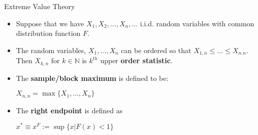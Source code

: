 \documentclass[notes]{beamer}
\begin{document}
\begin{frame}{Extreme Value Theory}
\begin{itemize}
\item Suppose that we have $X_1, X_2, ... , X_n, ... $ i.i.d. random variables with common distribution function $F$.  \pause
\item The random variables, $X_1, ... , X_n$ can be ordered so that $X_{1,n} \le ... \le X_{n.n}$. Then $X_{k,n} $ for $k \in \mathbb{N}$ is $k^{th}$ upper \textbf{order statistic}. \pause

\item The \textbf{sample/block maximum} is defined to be:

\begin{center} $ X_{n,n} = \max\{X_1, ... , X_n\}$ \end{center} \pause

\item The \textbf{right endpoint} is defined as

\begin{center} $x^* \equiv x^F:= \sup\{x | F(x) < 1\}$ \end{center} 


\end{itemize}
\end{frame}
\end{document}
